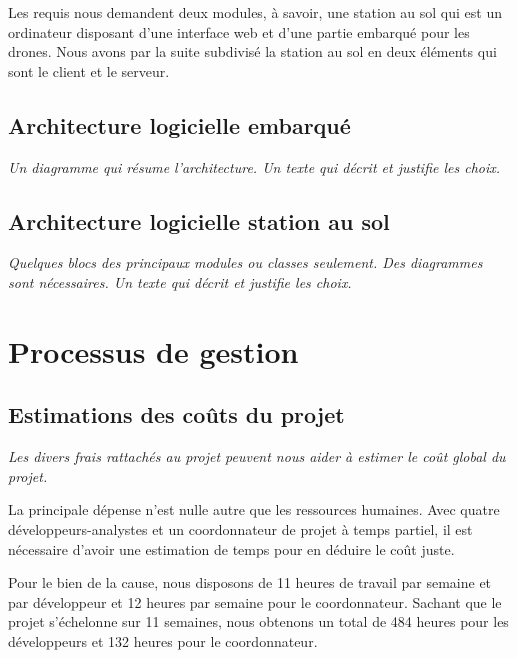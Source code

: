 \documentclass{mistcoursedoc}
\begin{document}
\par Les requis nous demandent deux modules, à savoir, une station au sol qui est un ordinateur disposant d'une interface web et d'une partie embarqué pour les drones. Nous avons par la suite subdivisé la station au sol en deux éléments qui sont le client et le serveur.

\subsection{Architecture logicielle embarqué}

\textit{Un diagramme qui résume l’architecture.  Un texte qui décrit et justifie les choix.}


\subsection{Architecture logicielle station au sol}

\textit{Quelques blocs des principaux modules ou classes seulement.  Des diagrammes sont nécessaires.  Un texte qui décrit et justifie les choix.}
  

\section{Processus de gestion}

\subsection{Estimations des coûts du projet}

\textit{Les divers frais rattachés au projet peuvent nous aider à estimer le coût global du projet.}

La principale dépense n’est nulle autre que les ressources humaines.
Avec quatre développeurs-analystes et un coordonnateur de projet à temps partiel, 
il est nécessaire d’avoir une estimation de temps pour en déduire le coût juste. 

Pour le bien de la cause, nous disposons de 11 heures de travail par semaine et par développeur et 12 heures par semaine pour le coordonnateur.
Sachant que le projet s’échelonne sur 11 semaines, nous obtenons un total de 484 heures pour les développeurs 
et 132 heures pour le coordonnateur. 
\end{document}
